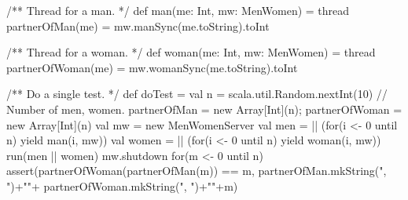 \begin{answerI}
\begin{scala}
  /** Thread for a man. */
  def man(me: Int, mw: MenWomen) = thread{
    partnerOfMan(me) = mw.manSync(me.toString).toInt
  }

  /** Thread for a woman. */
  def woman(me: Int, mw: MenWomen) = thread{
    partnerOfWoman(me) = mw.womanSync(me.toString).toInt
  }

  /** Do a single test. */
  def doTest = {
    val n = scala.util.Random.nextInt(10) // Number of men, women.
    partnerOfMan = new Array[Int](n); partnerOfWoman = new Array[Int](n)
    val mw = new MenWomenServer 
    val men = || (for(i <- 0 until n) yield man(i, mw))
    val women = || (for(i <- 0 until n) yield woman(i, mw))
    run(men || women)
    mw.shutdown
    for(m <- 0 until n)
      assert(partnerOfWoman(partnerOfMan(m)) == m,
             partnerOfMan.mkString(", ")+"\n"+
               partnerOfWoman.mkString(", ")+"\n"+m)
  }
\end{scala}
\end{answerI}
% 









